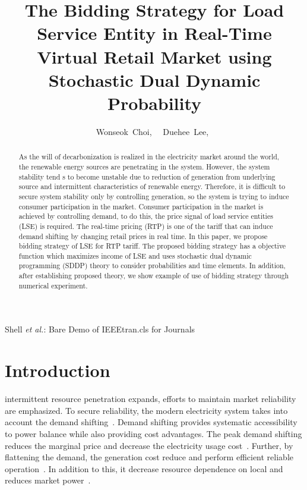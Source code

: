 \documentclass[journal]{IEEEtran} %
\begin{document}
\title{The Bidding Strategy for Load Service Entity in Real-Time Virtual Retail Market using Stochastic Dual Dynamic Probability}

\author{Wonseok~Choi,~ 
	~Duehee~Lee,~
	}


%
{Shell \MakeLowercase{\textit{et al.}}: Bare Demo of IEEEtran.cls for Journals}
\maketitle

\begin{abstract}
As the will of decarbonization is realized in the electricity market around the world, the renewable energy sources are penetrating in the system. However, the system stability tend s to become unstable due to reduction of generation from underlying source and intermittent characteristics of renewable energy. Therefore, it is difficult to secure system stability only by controlling generation, so the system is trying to induce consumer participation in the market. Consumer participation in the market is achieved by controlling demand, to do this, the price signal of load service entities (LSE) is required. The real-time pricing (RTP) is one of the tariff that can induce demand shifting by changing retail prices in real time. In this paper, we propose bidding strategy of LSE for RTP tariff. The proposed bidding strategy has a objective function which maximizes income of LSE and uses stochastic dual dynamic programming (SDDP) theory to consider probabilities and time elements. In addition, after establishing proposed theory, we show example of use of bidding strategy through numerical experiment.
\end{abstract}






\section{Introduction}

 intermittent resource penetration expands, efforts to maintain market reliability are emphasized. To secure reliability, the modern electricity system takes into account the demand shifting~\cite{pazouki2014uncertainty}. Demand shifting provides systematic accessibility to power balance while also providing cost advantages. The peak demand shifting reduces the marginal price and decrease the electricity usage cost~\cite{earle2000demand}. Further, by flattening the demand, the generation cost reduce and perform efficient reliable operation~\cite{goldman2005customer}. 
In addition to this, it decrease resource dependence on local and reduces market power~\cite{rassenti2003controlling}.
\end{document}

